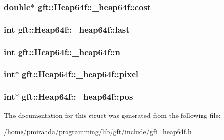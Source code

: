 \subsubsection[{\texorpdfstring{cost}{cost}}]{\setlength{\rightskip}{0pt plus 5cm}double$\ast$ gft\+::\+Heap64f\+::\+\_\+heap64f\+::cost}\hypertarget{structgft_1_1Heap64f_1_1__heap64f_a68ea05d73c380a8d388778d0aa4ce756}{}\label{structgft_1_1Heap64f_1_1__heap64f_a68ea05d73c380a8d388778d0aa4ce756}
\subsubsection[{\texorpdfstring{last}{last}}]{\setlength{\rightskip}{0pt plus 5cm}int gft\+::\+Heap64f\+::\+\_\+heap64f\+::last}\hypertarget{structgft_1_1Heap64f_1_1__heap64f_aa24cd2e1ae114ff4d798b7c3ca9eaabb}{}\label{structgft_1_1Heap64f_1_1__heap64f_aa24cd2e1ae114ff4d798b7c3ca9eaabb}
\subsubsection[{\texorpdfstring{n}{n}}]{\setlength{\rightskip}{0pt plus 5cm}int gft\+::\+Heap64f\+::\+\_\+heap64f\+::n}\hypertarget{structgft_1_1Heap64f_1_1__heap64f_ab17122bfc57a325380ab6e1e81480bdc}{}\label{structgft_1_1Heap64f_1_1__heap64f_ab17122bfc57a325380ab6e1e81480bdc}
\subsubsection[{\texorpdfstring{pixel}{pixel}}]{\setlength{\rightskip}{0pt plus 5cm}int$\ast$ gft\+::\+Heap64f\+::\+\_\+heap64f\+::pixel}\hypertarget{structgft_1_1Heap64f_1_1__heap64f_aab4e3f723e085f0d5c736adaae30429f}{}\label{structgft_1_1Heap64f_1_1__heap64f_aab4e3f723e085f0d5c736adaae30429f}
\subsubsection[{\texorpdfstring{pos}{pos}}]{\setlength{\rightskip}{0pt plus 5cm}int$\ast$ gft\+::\+Heap64f\+::\+\_\+heap64f\+::pos}\hypertarget{structgft_1_1Heap64f_1_1__heap64f_ade3e491853f21a3f1275ea8588ffd4b1}{}\label{structgft_1_1Heap64f_1_1__heap64f_ade3e491853f21a3f1275ea8588ffd4b1}


The documentation for this struct was generated from the following file\+:\begin{DoxyCompactItemize}
\item 
/home/pmiranda/programming/lib/gft/include/\hyperlink{gft__heap64f_8h}{gft\+\_\+heap64f.\+h}\end{DoxyCompactItemize}
